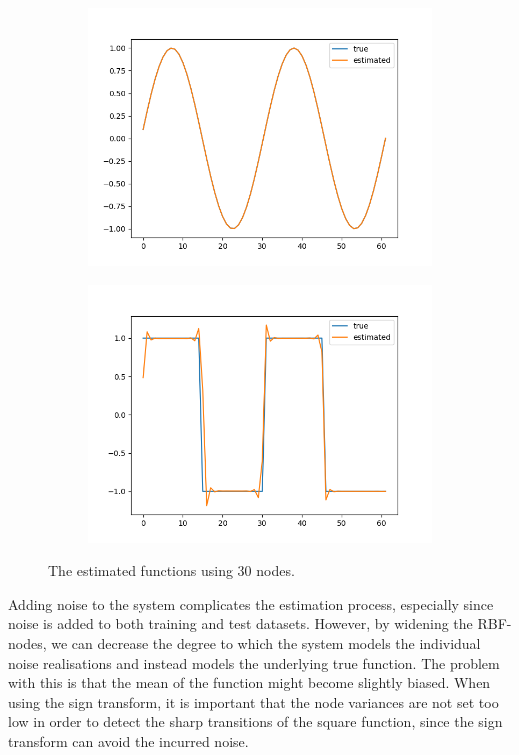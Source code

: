 \documentclass[a4paper]{article}
\begin{document}
\begin{figure}[ht]
   \begin{subfigure}[b]{0.5\textwidth}
	 \centering
	 \includegraphics[width=\linewidth]{figures/sineclean.png}
   \end{subfigure}
 	\begin{subfigure}[b]{0.5\textwidth}
	 \centering
	 \includegraphics[width=\linewidth]{figures/squareclean.png}
   \end{subfigure}
   \caption{The estimated functions using 30 nodes.}
\end{figure}
Adding noise to the system complicates the estimation process, especially since noise is added to both training and test datasets. However, by widening the RBF-nodes, we can decrease the degree to which the system models the individual noise realisations and instead models the underlying true function. The problem with this is that the mean of the function might become slightly biased. When using the sign transform, it is important that the node variances are not set too low in order to detect the sharp transitions of the square function, since the sign transform can avoid the incurred noise.
\end{document}
